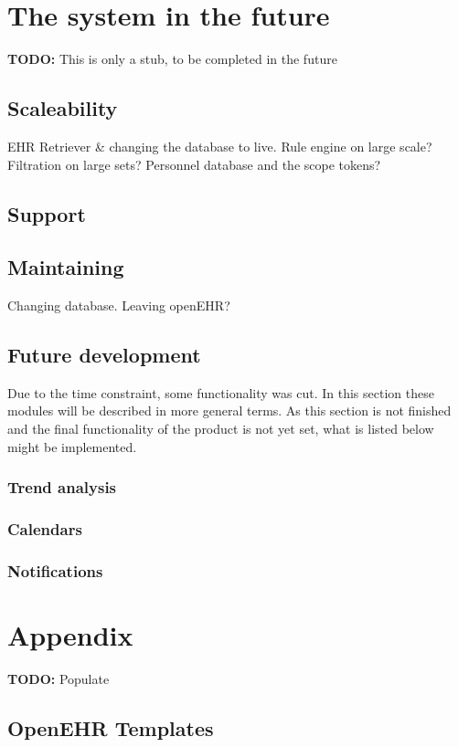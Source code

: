 \documentclass{article}
\begin{document}
\clearpage
\section{The system in the future}
\textbf{TODO:} 
This is only a stub, to be completed in the future
\subsection{Scaleability}
EHR Retriever & changing the database to live. Rule engine on large scale? Filtration on large sets? Personnel database and the scope tokens?
\subsection{Support}
\subsection{Maintaining}
Changing database. Leaving openEHR? 
\subsection{Future development}
Due to the time constraint, some functionality was cut. In this section these modules will be described in more general terms. As this section is not finished and the final functionality of the product is not yet set, what is listed below might be implemented.
\subsubsection{Trend analysis}
\subsubsection{Calendars}
\subsubsection{Notifications}

\section{Appendix}
\textbf{TODO:} Populate
\subsection{OpenEHR Templates}
\end{document}
